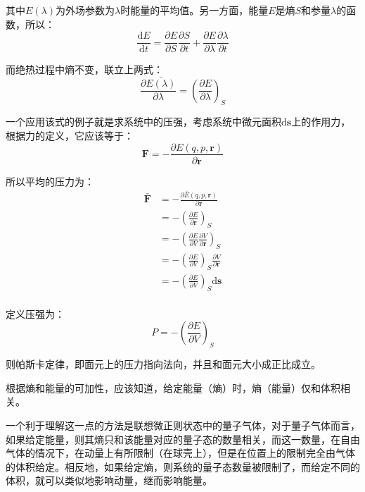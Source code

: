 \documentclass[UTF8]{ctexart}
\begin{document}
\begin{spacing}{2.0}
其中$E(\lambda)$为外场参数为$\lambda$时能量的平均值。另一方面，能量$E$是熵$S$和参量$\lambda$的函数，所以：
\begin{equation}
\frac{\text{d}E}{\text{d}t}=\frac{\partial E}{\partial S}\frac{\partial S}{\partial t} + \frac{\partial E}{\partial\lambda}\frac{\partial\lambda}{\partial t}
\end{equation}

而绝热过程中熵不变，联立上两式：
\begin{equation}
\frac{\partial \bar{E(\lambda)}}{\partial \lambda}=\left(\frac{\partial E}{\partial\lambda}\right)_{S}
\end{equation}

一个应用该式的例子就是求系统中的压强，考虑系统中微元面积$\text{d}\textbf{s}$上的作用力，根据力的定义，它应该等于：
\begin{equation}
\textbf{F}=-\frac{\partial E(q,p,\textbf{r})}{\partial \textbf{r}}
\end{equation}

所以平均的压力为：
\begin{equation}
\begin{aligned}
\bar{\textbf{F}}&=-\frac{\partial \bar{E}(q,p,\textbf{r})}{\partial \textbf{r}}\\
&=-\left(\frac{\partial E}{\partial \textbf{r}} \right)_{S} \\ 
&=-\left(\frac{\partial E}{\partial V}\frac{\partial V}{\partial \textbf{r}} \right)_{S} \\ 
&=-\left(\frac{\partial E}{\partial V} \right)_{S} \frac{\partial V}{\partial \textbf{r}}\\ 
&=-\left(\frac{\partial E}{\partial V} \right)_{S} \text{d}\textbf{s}\\ 
\end{aligned}
\end{equation}

定义压强为：
\begin{equation}
P=-\left(\frac{\partial E}{\partial V} \right)_{S} 
\end{equation}

则帕斯卡定律，即面元上的压力指向法向，并且和面元大小成正比成立。

根据熵和能量的可加性，应该知道，给定能量（熵）时，熵（能量）仅和体积相关。

一个利于理解这一点的方法是联想微正则状态中的量子气体，对于量子气体而言，如果给定能量，则其熵只和该能量对应的量子态的数量相关，而这一数量，在自由气体的情况下，在动量上有所限制（在球壳上），但是在位置上的限制完全由气体的体积给定。相反地，如果给定熵，则系统的量子态数量被限制了，而给定不同的体积，就可以类似地影响动量，继而影响能量。


\end{spacing}
\end{document}
